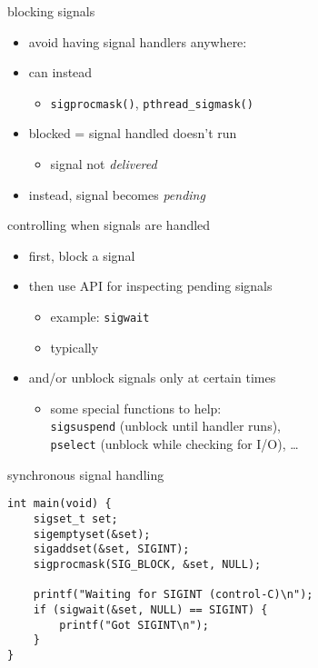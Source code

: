 \begin{frame}{blocking signals}
\begin{itemize}
\item avoid having signal handlers anywhere:
\item can instead 
    \begin{itemize}
    \item \texttt{sigprocmask()}, \texttt{pthread\_sigmask()}
    \end{itemize}
\vspace{.5cm}
\item blocked = signal handled doesn't run
    \begin{itemize}
    \item signal not \textit{delivered}
    \end{itemize}
\item instead, signal becomes \textit{pending}
\end{itemize}
\end{frame}

\begin{frame}{controlling when signals are handled}
\begin{itemize}
\item first, block a signal
\item then use API for inspecting pending signals
    \begin{itemize}
    \item example: {\tt sigwait}
    \item typically 
    \end{itemize}
\item and/or unblock signals only at certain times
    \begin{itemize}
        \item some special functions to help: \\ {\tt sigsuspend} (unblock until handler runs), \\ {\tt pselect} (unblock while checking for I/O), \ldots
    \end{itemize}
\end{itemize}
\end{frame}

\begin{frame}[fragile,label=syncSig]{synchronous signal handling}
\lstset{language=C,style=small}
\begin{lstlisting}
int main(void) {
    sigset_t set;
    sigemptyset(&set);
    sigaddset(&set, SIGINT);
    sigprocmask(SIG_BLOCK, &set, NULL);
    
    printf("Waiting for SIGINT (control-C)\n"); 
    if (sigwait(&set, NULL) == SIGINT) {
        printf("Got SIGINT\n");
    }
}
\end{lstlisting}
\end{frame}

